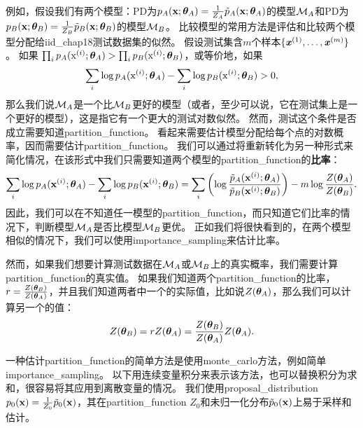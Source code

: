 例如，假设我们有两个模型：\gls{PD}为$p_A(\mathbf{x}; \boldsymbol{\theta}_A)= \frac{1}{Z_A} \tilde{p}_A(\mathbf{x}; \boldsymbol{\theta}_A)$的模型$\mathcal{M}_A$和\gls{PD}为$p_B(\mathbf{x}; \boldsymbol{\theta}_B)= \frac{1}{Z_B} \tilde{p}_B(\mathbf{x}; \boldsymbol{\theta}_B)$的模型$\mathcal{M}_B$。
比较模型的常用方法是评估和比较两个模型分配给\gls{iid_chap18}测试数据集的似然。
假设测试集含$m$个样本$\{ \boldsymbol{\mathit{x}}^{(1)}, \dots, \boldsymbol{\mathit{x}}^{(m)} \}$。
如果 $\prod_i p_A ( \mathrm{x}^{(i)}; \boldsymbol{\theta}_A) > \prod_i p_B( \mathrm{x}^{(i)}; \boldsymbol{\theta}_B)$，或等价地，如果
\begin{equation}
\label{eq:18.38}
	\sum_i \log p_A (\mathrm{x}^{(i)}; \boldsymbol{\theta}_A) - \sum_i \log p_B(\mathrm{x}^{(i)}; \boldsymbol{\theta}_B) > 0,
\end{equation}
那么我们说$\mathcal{M}_A$是一个比$\mathcal{M}_B$更好的模型（或者，至少可以说，它在测试集上是一个更好的模型），这是指它有一个更大的测试对数似然。
然而，测试这个条件是否成立需要知道\gls{partition_function}。
看起来需要估计模型分配给每个点的对数概率，因而需要估计\gls{partition_function}。
我们可以通过将重新转化为另一种形式来简化情况，在该形式中我们只需要知道两个模型的\gls{partition_function}的\textbf{比率}：
\begin{equation}
\label{eq:18.39}
	\sum_i \log p_A(\mathbf{x}^{(i)}; \boldsymbol{\theta}_A) - \sum_i \log p_B(\mathbf{x}^{(i)}; \boldsymbol{\theta}_B) =
	\sum_i \left(  \log \frac{ \tilde{p}_A(\mathbf{x}^{(i)}; \boldsymbol{\theta}_A) }{ \tilde{p}_B(\mathbf{x}^{(i)}; \boldsymbol{\theta}_B) } \right)  - m\log \frac{Z(\boldsymbol{\theta}_A)}{ Z(\boldsymbol{\theta}_B) }.
\end{equation}
因此，我们可以在不知道任一模型的\gls{partition_function}，而只知道它们比率的情况下，判断模型$\mathcal{M}_A$是否比模型$\mathcal{M}_B$更优。
正如我们将很快看到的，在两个模型相似的情况下，我们可以使用\gls{importance_sampling}来估计比率。


然而，如果我们想要计算测试数据在$\mathcal{M}_A$或$\mathcal{M}_B$上的真实概率，我们需要计算\gls{partition_function}的真实值。
如果我们知道两个\gls{partition_function}的比率，$r = \frac{Z(\boldsymbol{\theta}_B)}{ Z(\boldsymbol{\theta}_A) }$，并且我们知道两者中一个的实际值，比如说$Z(\boldsymbol{\theta}_A)$，那么我们可以计算另一个的值：
\begin{equation}
	Z(\boldsymbol{\theta}_B) = r Z(\boldsymbol{\theta}_A) = \frac{ Z(\boldsymbol{\theta}_B) }{ Z(\boldsymbol{\theta}_A) } Z(\boldsymbol{\theta}_A).
\end{equation}


一种估计\gls{partition_function}的简单方法是使用\gls{monte_carlo}方法，例如简单\gls{importance_sampling}。
以下用连续变量积分来表示该方法，也可以替换积分为求和，很容易将其应用到离散变量的情况。
我们使用\gls{proposal_distribution} $p_0(\mathbf{x}) = \frac{1}{Z_0} \tilde{p}_0( \mathbf{x})$，其在\gls{partition_function} $Z_0$和未归一化分布$\tilde{p}_0(\mathbf{x})$上易于采样和估计。

